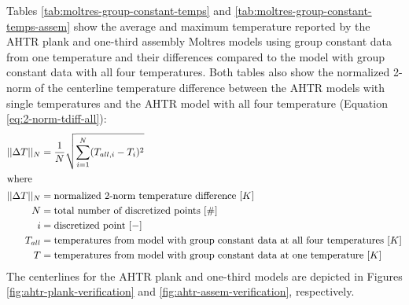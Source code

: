 Tables \ref{tab:moltres-group-constant-temps} and 
\ref{tab:moltres-group-constant-temps-assem}
show the average and maximum temperature reported by the \gls{AHTR} plank and one-third 
assembly Moltres models using group constant data from one temperature and their 
differences compared to the model with group constant data with all four temperatures. 
Both tables also show the normalized 2-norm of the centerline temperature difference 
between the \gls{AHTR} models with single temperatures and the \gls{AHTR} model with all four 
temperature (Equation \ref{eq:2-norm-tdiff-all}):
\begin{align}
    \label{eq:2-norm-tdiff-all}
    ||\Delta T||_N &= \frac{1}{N}\sqrt{\sum_{i=1}^N(T_{all, i} - T_{i})^2} \\
\intertext{where}
    ||\Delta T||_N &= \mbox{normalized 2-norm temperature difference } [K]\nonumber \\
    N &= \mbox{total number of discretized points } [\#] \nonumber \\
    i &= \mbox{discretized point } [-] \nonumber \\
    T_{all} &= \mbox{temperatures from model with group constant data at all four temperatures } [K] \nonumber \\
    T &= \mbox{temperatures from model with group constant data at one temperature } [K] \nonumber 
\end{align}
The centerlines for the \gls{AHTR} plank and one-third models are depicted in Figures 
\ref{fig:ahtr-plank-verification} and \ref{fig:ahtr-assem-verification}, respectively. 

